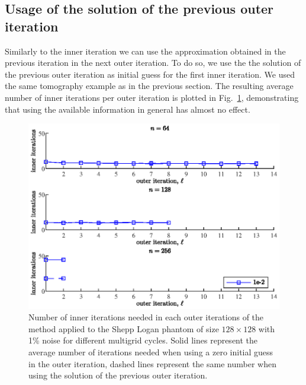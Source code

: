\subsection{Usage of the solution of the previous outer iteration}
Similarly to the inner iteration we can use the approximation obtained in the previous iteration in the next outer iteration. To do so, we use the the solution of the previous outer iteration as initial guess for the first inner iteration. We used the same tomography example as in the previous section. The resulting average number of inner iterations per outer iteration is plotted in Fig.~\ref{fig:outer_iteration_zero_initial_guess}, demonstrating that using the available information in general has almost no effect.
\begin{figure}[htbp]
\begin{center}
\includegraphics{figures/outer_iteration_zero_initial_guess}
\caption{Number of inner iterations needed in each outer iterations of the method applied to the Shepp Logan phantom of size $128 \times 128$ with 1\% noise for different multigrid cycles. Solid lines represent the average number of iterations needed when using a zero initial guess in the outer iteration, dashed lines represent the same number when using the solution of the previous outer iteration.}
\label{fig:outer_iteration_zero_initial_guess}
\end{center}
\end{figure}

